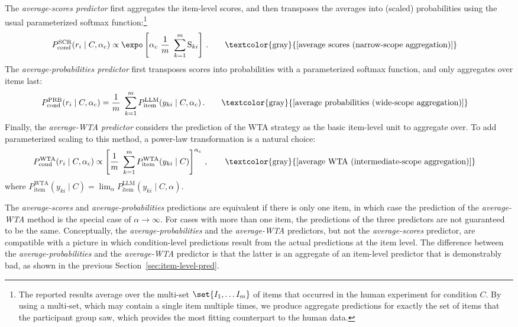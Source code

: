 \documentclass[fleqn]{article}
\begin{document}
The \emph{average-scores predictor} first aggregates the item-level scores, and then transposes the averages into (scaled) probabilities using the usual parameterized softmax function:\footnote{
  The reported results average over the multi-set \(\set{I_1, \dots I_m}\) of items that occurred in the human experiment for condition $C$.
  By using a multi-set, which may contain a single item multiple times, we produce aggregate predictions for exactly the set of items that the participant group saw, which provides the most fitting counterpart to the human data.}
%
\begin{align*}
  & P_{\text{cond}}^{\text{SCR}}(r_{i} \mid C, \alpha_{c})
    \propto \expo \left [  \alpha_{c} \ \frac{1}{m} \ \sum_{k=1}^{m} \text{S}_{ki}  \right ] \,.
    \tag*{\textcolor{gray}{[average scores (narrow-scope aggregation)]}}
\end{align*}
%
The \emph{average-probabilities predictor} first transposes scores into probabilities with a parameterized softmax function, and only aggregates over items last:
\begin{align*}
  & P_{\text{cond}}^{\text{PRB}}(r_{i} \mid C, \alpha_{c})
    = \frac{1}{m} \ \sum_{k=1}^{m} P_{\text{item}}^{\text{LLM}}(y_{ki} \mid C, \alpha_{c}) \,.
    \tag*{\textcolor{gray}{[average probabilities (wide-scope aggregation)]}}
\end{align*}
%
Finally, the \emph{average-WTA predictor} considers the prediction of the WTA strategy as the basic item-level unit to aggregate over.
To add parameterized scaling to this method, a power-law transformation is a natural choice:
\begin{align*}
  & P_{\text{cond}}^{\text{WTA}}(r_{i} \mid C, \alpha_{c})
    \propto  \left [ \frac{1}{m} \ \sum_{k=1}^{m} P_{\text{item}}^{\text{WTA}}(y_{ki} \mid C) \right ]^{\alpha_{c}}\,,
    \tag*{\textcolor{gray}{[average WTA (intermediate-scope aggregation)]}}
\end{align*}
where $P_{\text{item}}^{\text{WTA}}(y_{ki} \mid C) = \lim_{\alpha} P_{\text{item}}^{\text{LLM}}(y_{ki} \mid C, \alpha)$.
\bigskip


The \emph{average-scores} and \emph{average-probabilities} predictions are equivalent if there is only one item, in which case the prediction of the \emph{average-WTA} method is the special case of $\alpha \rightarrow \infty$.
For cases with more than one item, the predictions of the three predictors are not guaranteed to be the same.
Conceptually, the \emph{average-probabilities} and the \emph{average-WTA} predictors, but not the \emph{average-scores} predictor, are compatible with a picture in which condition-level predictions result from the actual predictions at the item level.
The difference between the \emph{average-probabilities} and the \emph{average-WTA} predictor is that the latter is an aggregate of an item-level predictor that is demonstrably bad, as shown in the previous Section~\ref{sec:item-level-pred}.
\end{document}

